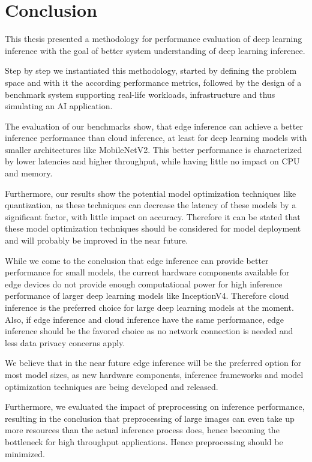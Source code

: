 \chapter{Conclusion}
\label{chap:conclusion}
%
This thesis presented a methodology for performance evaluation of deep learning inference with the goal of better system understanding of deep learning inference.

Step by step we instantiated this methodology, started by defining the problem space and with it the according performance metrics, followed by the design of a benchmark system supporting real-life workloads, infrastructure and thus simulating an AI application.

The evaluation of our benchmarks show, that edge inference can achieve a better inference performance than cloud inference, at least for deep learning models with smaller architectures like MobileNetV2.
This better performance is characterized by lower latencies and higher throughput, while having little no impact on CPU and memory.

Furthermore, our results show the potential model optimization techniques like quantization, as these techniques can decrease the latency of these models by a significant factor, with little impact on accuracy.
Therefore it can be stated that these model optimization techniques should be considered for model deployment and will probably be improved in the near future.

While we come to the conclusion that edge inference can provide better performance for small models, the current hardware components available for edge devices do not provide enough computational power for high inference performance of larger deep learning models like InceptionV4.
Therefore cloud inference is the preferred choice for large deep learning models at the moment.
Also, if edge inference and cloud inference have the same performance, edge inference should be the favored choice as no network connection is needed and less data privacy concerns apply.

We believe that in the near future edge inference will be the preferred option for most model sizes, as new hardware components, inference frameworks and model optimization techniques are being developed and released.

Furthermore, we evaluated the impact of preprocessing on inference performance, resulting in the conclusion that preprocessing of large images can even take up more resources than the actual inference process does, hence becoming the bottleneck for high throughput applications.
Hence preprocessing should be minimized.

